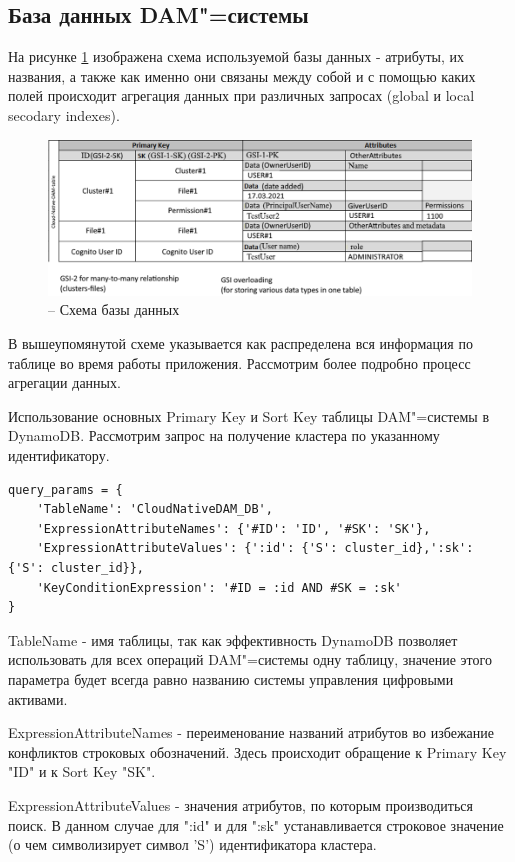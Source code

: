 \subsection{База данных DAM"=системы}
На рисунке \ref{dbSchema} изображена схема используемой базы данных - атрибуты, их названия, а также как именно они связаны между собой и с помощью каких полей происходит агрегация данных при различных запросах (global и local secodary indexes).
\begin{figure}[H]
    \centering
    \includegraphics[scale=0.65]{images/DbSchema.png}
    \caption{-- Схема базы данных}
    \label{dbSchema}
\end{figure}

В вышеупомянутой схеме указывается как распределена вся информация по таблице во время работы приложения. Рассмотрим более подробно процесс агрегации данных.

Использование основных Primary Key и Sort Key таблицы DAM"=системы в DynamoDB. Рассмотрим запрос на получение кластера по указанному идентификатору.
\begin{lstlisting}
query_params = {
    'TableName': 'CloudNativeDAM_DB',
    'ExpressionAttributeNames': {'#ID': 'ID', '#SK': 'SK'},
    'ExpressionAttributeValues': {':id': {'S': cluster_id},':sk': {'S': cluster_id}},
    'KeyConditionExpression': '#ID = :id AND #SK = :sk'
}
\end{lstlisting}
TableName - имя таблицы, так как эффективность DynamoDB позволяет использовать для всех операций DAM"=системы одну таблицу, значение этого параметра будет всегда равно названию системы управления цифровыми активами.

ExpressionAttributeNames - переименование названий атрибутов во избежание конфликтов строковых обозначений. Здесь происходит обращение к Primary Key "ID" и к Sort Key "SK".

ExpressionAttributeValues - значения атрибутов, по которым производиться поиск. В данном случае для ":id" и для ":sk" устанавливается строковое значение (о чем символизирует символ 'S') идентификатора кластера.


